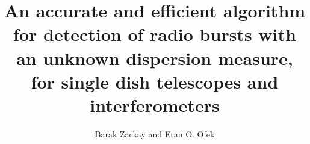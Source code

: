 \documentclass[iop]{emulateapj}
\begin{document}

\title{An accurate and efficient algorithm for detection of radio bursts with an unknown dispersion measure, for single dish telescopes and interferometers}


\author{Barak Zackay\altaffilmark{} and Eran O. Ofek\altaffilmark{}}




\end{document}
